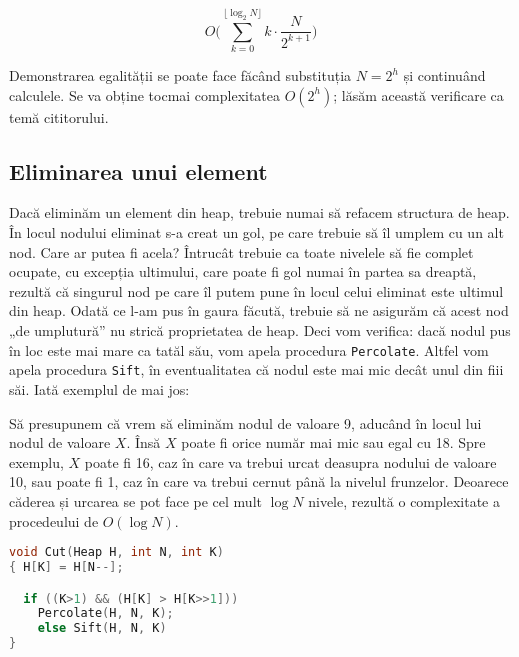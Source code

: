 \begin{equation}
  O \biggl( \sum_{k = 0}^{\lfloor \log_2 N \rfloor} k \cdot \frac{N}{2^{k + 1}} \biggr)
\end{equation}

Demonstrarea egalității se poate face făcând substituția $N=2^h$ și continuând
calculele. Se va obține tocmai complexitatea $O(2^h)$; lăsăm această
verificare ca temă cititorului.

\subsection{Eliminarea unui element}

Dacă eliminăm un element din heap, trebuie numai să refacem structura de
heap. În locul nodului eliminat s-a creat un gol, pe care trebuie să îl umplem
cu un alt nod. Care ar putea fi acela? Întrucât trebuie ca toate nivelele să
fie complet ocupate, cu excepția ultimului, care poate fi gol numai în partea
sa dreaptă, rezultă că singurul nod pe care îl putem pune în locul celui
eliminat este ultimul din heap. Odată ce l-am pus în gaura făcută, trebuie să
ne asigurăm că acest nod „de umplutură” nu strică proprietatea de heap. Deci
vom verifica: dacă nodul pus în loc este mai mare ca tatăl său, vom apela
procedura {\tt Percolate}. Altfel vom apela procedura {\tt Sift}, în
eventualitatea că nodul este mai mic decât unul din fiii săi. Iată exemplul de
mai jos:


Să presupunem că vrem să eliminăm nodul de valoare 9, aducând în locul lui
nodul de valoare $X$. Însă $X$ poate fi orice număr mai mic sau egal cu
18. Spre exemplu, $X$ poate fi 16, caz în care va trebui urcat deasupra
nodului de valoare 10, sau poate fi 1, caz în care va trebui cernut până la
nivelul frunzelor. Deoarece căderea și urcarea se pot face pe cel mult $\log
N$ nivele, rezultă o complexitate a procedeului de $O(\log N)$.

\begin{lstlisting}[language=C]
void Cut(Heap H, int N, int K)
{ H[K] = H[N--];

  if ((K>1) && (H[K] > H[K>>1]))
    Percolate(H, N, K);
    else Sift(H, N, K)
}
\end{lstlisting}

